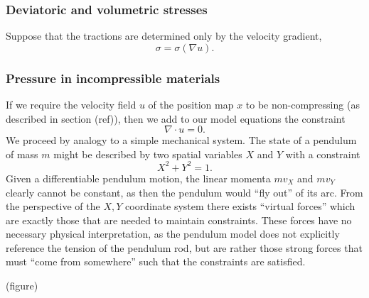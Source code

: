 \documentclass[11pt,a4paper]{memoir}
\begin{document}
\subsubsection{Deviatoric and volumetric stresses}
Suppose that the tractions are determined only by the velocity gradient,
    $$\sigma = \sigma(\nabla u).$$

\subsubsection{Pressure in incompressible materials}
If we require the velocity field $u$ of the position map $x$ to be non-compressing (as described in section (ref)),
then we add to our model equations the constraint
\begin{equation}\label{noncompressing_velocity}
    \nabla \cdot u = 0.
\end{equation}
We proceed by analogy to a simple mechanical system.
The state of a pendulum of mass $m$ might be described by two spatial variables $X$ and $Y$ with a constraint
    $$X^2 + Y^2 = 1.$$
Given a differentiable pendulum motion, the linear momenta $mv_X$ and $mv_Y$ clearly cannot be constant, as then the pendulum
would ``fly out'' of its arc.
From the perspective of the $X,Y$ coordinate system there exists ``virtual forces'' which are exactly those that are needed
to maintain constraints. These forces have no necessary physical interpretation, as the pendulum model does not explicitly reference
the tension of the pendulum rod, but are rather those strong forces that must ``come from somewhere'' such that the constraints
are satisfied.

\vskip 0.2in
(figure)
\vskip 0.2in
\end{document}
